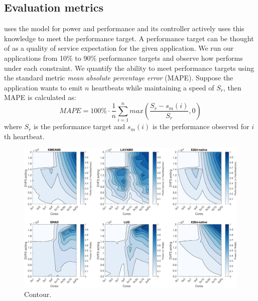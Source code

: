 \subsection{Evaluation metrics}

\SYSTEM{} uses the model for power and performance and its controller
actively uses this knowledge to meet the performance target. A
performance target can be thought of as a quality of service
expectation for the given application. We run our applications from
10\% to 90\% performance targets and observe how \SYSTEM{} performs
under each constraint. We quantify the ability to meet performance
targets using the standard metric \emph{mean absolute percentage
  error} (MAPE).  Suppose the application wants to emit $n$ heartbeats
while maintaining a speed of $S_r$, then MAPE is calculated as:
\begin{equation}
MAPE = 100\% \cdot \frac{1}{n} \sum\limits_{i=1}^{n} max \left( \frac{S_{r} - s_m(i)}{S_r},0 \right)
\end{equation}
where $S_{r}$ is the performance target and $s_m(i)$ is the
performance observed for $i$th heartbeat.

\begin{figure}
\centering
\includegraphics[scale=0.4]{figures/sample-contour3.png}
\caption{Contour.}
  \label{fig:contour}
\end{figure}

